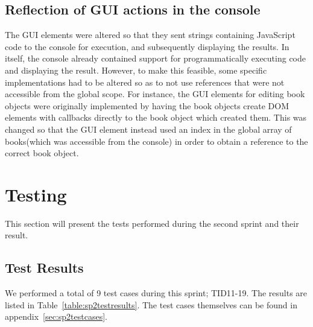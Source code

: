 \subsection{Reflection of GUI actions in the console}
The GUI elements were altered so that they sent strings containing JavaScript code to the console for execution, and subsequently displaying the results. In itself, the console already contained support for programmatically executing code and displaying the result. However, to make this feasible, some specific implementations had to be altered so as to not use references that were not accessible from the global scope. For instance, the GUI elements for editing book objects were originally implemented by having the book objects create DOM elements with callbacks directly to the book object which created them. This was changed so that the GUI element instead used an index in the global array of books(which was accessible from the console) in order to obtain a reference to the correct book object.

\section{Testing}
This section will present the tests performed during the second sprint and their result.

\subsection{Test Results}
We performed a total of 9 test cases during this sprint; TID11-19. The results are listed in Table~\ref{table:sp2testresults}. The test cases themselves can be found in appendix~\ref{sec:sp2testcases}.

